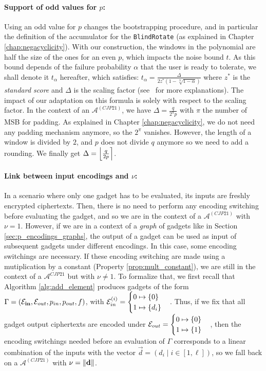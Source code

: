 \paragraph{Support of odd values for $p$:} Using an odd value for $p$ changes the bootstrapping procedure, and in particular the definition of the accumulator for the \texttt{BlindRotate} (as explained in Chapter \ref{chap:negacyclicity}). With our construction, the windows in the polynomial are half the size of the ones for an even $p$, which impacts the noise bound $t$. 
As this bound depends of the failure probability $\alpha$ that the user is ready to tolerate, we shall denote it $t_\alpha$ hereafter, which satisfies: $t_\alpha = \frac{\Delta}{2z^*(1-\sqrt[N]{1-\alpha})}$
where $z^*$ is the \emph{standard score} and $\Delta$ is the scaling factor (see~\cite{AC:CLOT21} for more explanations). The impact of our adaptation on this formula is solely with respect to the scaling factor. In the context of an $\mathcal{A}^{(CJP21)}$, we have $\Delta = \frac{q}{2^\pi p}$ with $\pi$ the number of MSB for padding. As explained in Chapter \ref{chap:negacyclicity}, we do not need any padding mechanism anymore, so the $2^\pi$ vanishes. However, the length of a window is divided by $2$, and $p$ does not divide $q$ anymore so we need to add a rounding. We finally get $\Delta = \left \lfloor \frac{q}{2p} \right \rceil$.

%
\paragraph{Link between input encodings and $\nu$:} In a scenario where only one gadget has to be evaluated, its inputs are freshly encrypted ciphertexts. Then, there is no need to perform any encoding switching before evaluating the gadget, and so we are in the context of a $\mathcal{A}^{(CJP21)}$ with $\nu = 1$. However, if we are in a context of a \textit{graph} of gadgets like in Section \ref{sec:p_encodings_graphs}, the output of a gadget can be used as input of subsequent gadgets under different encodings. In this case, some encoding switchings are necessary. If these encoding switching are made using a mutiplication by a constant (Property \ref{prop:mult_constant}), we are still in the context of a $\mathcal{A}^{CJP21}$ but with $\nu \ne 1$. 
To formalize that, we first recall that Algorithm \ref{alg:add_element} produces gadgets of the form $\Gamma = \left (\mathbf{\mathcal{E}_{in}}, \mathcal{E}_{out}, p_{in}, p_{out}, f \right )$, with $\mathcal{E}_{in}^{(i)} = \begin{cases} 0 \mapsto \{0\} \\ 1 \mapsto \{d_i\} \end{cases}$. Thus, if we fix that all gadget output ciphertexts are encoded under $\mathcal{E}_{out} = \begin{cases} 0 \mapsto \{0\} \\ 1 \mapsto \{1\} \end{cases}$, then the encoding switchings needed before an evaluation of $\Gamma$ corresponds to a linear combination of the inputs with the vector $\vec d = (d_i \mid i \in [1, \ell])$, so we fall back on a $\mathcal{A}^{(CJP21)}$ with $\nu = \lVert \mathbf d \rVert$.


